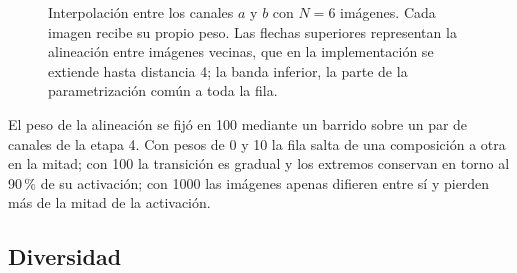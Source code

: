 \documentclass[11pt,a4paper]{article}
\begin{document}
\begin{figure}[!htb]
\centering
{}
\caption{Interpolación entre los canales $a$ y $b$ con $N = 6$ imágenes.
Cada imagen recibe su propio peso. Las flechas superiores representan la
alineación entre imágenes vecinas, que en la implementación se extiende
hasta distancia 4; la banda inferior, la parte de la parametrización común a
toda la fila.}
\label{fig:interp}
\end{figure}

El peso de la alineación se fijó en 100 mediante un barrido sobre un par de
canales de la etapa 4. Con pesos de 0 y 10 la fila salta de una
composición a otra en la mitad; con 100 la transición es gradual y los
extremos conservan en torno al 90\,\% de su activación; con 1000 las
imágenes apenas difieren entre sí y pierden más de la mitad de la
activación.

\subsection{Diversidad}
\label{sec:diversidad}
\end{document}
